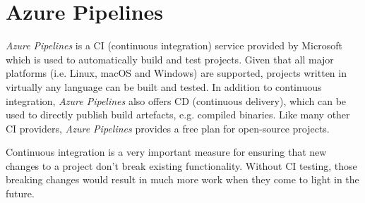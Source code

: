 \section{Azure Pipelines}

\textit{Azure Pipelines} is a CI (continuous integration) service provided by Microsoft which is
used to automatically build and test projects. Given that all major platforms (i.e. Linux, macOS and
Windows) are supported, projects written in virtually any language can be built and tested. In
addition to continuous integration, \textit{Azure Pipelines} also offers CD (continuous delivery),
which can be used to directly publish build artefacts, e.g. compiled binaries. Like many other
CI providers, \textit{Azure Pipelines} provides a free plan for open-source projects.
\cite{azure-pipelines}

Continuous integration is a very important measure for ensuring that new changes to a project don't
break existing functionality. Without CI testing, those breaking changes would result in much more
work when they come to light in the future.
